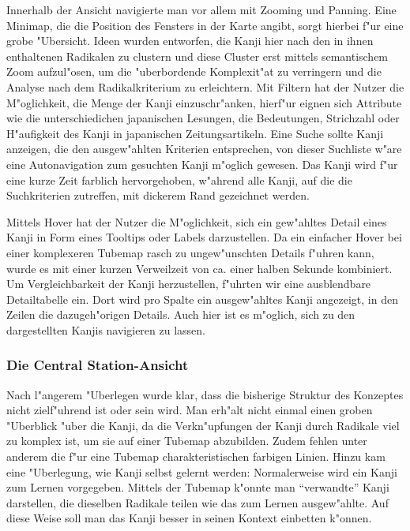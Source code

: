 Innerhalb der Ansicht navigierte man vor allem mit Zooming und Panning. Eine Minimap, die die Position des Fensters in der Karte angibt, sorgt hierbei f"ur eine grobe "Ubersicht. Ideen wurden entworfen, die Kanji hier nach den in ihnen enthaltenen Radikalen zu clustern und diese Cluster erst mittels semantischem Zoom aufzul"osen, um die "uberbordende Komplexit"at zu verringern und die Analyse nach dem Radikalkriterium zu erleichtern. Mit Filtern hat der Nutzer die M"oglichkeit, die Menge der Kanji einzuschr"anken, hierf"ur eignen sich Attribute wie die unterschiedichen japanischen Lesungen, die Bedeutungen, Strichzahl oder H"aufigkeit des Kanji in japanischen Zeitungsartikeln. Eine Suche sollte Kanji anzeigen, die den ausgew"ahlten Kriterien entsprechen, von dieser Suchliste w"are eine Autonavigation zum gesuchten Kanji m"oglich gewesen. Das Kanji wird f"ur eine kurze Zeit farblich hervorgehoben, w"ahrend alle Kanji, auf die die Suchkriterien zutreffen, mit dickerem Rand gezeichnet werden.

Mittels Hover hat der Nutzer die M"oglichkeit, sich ein gew"ahltes Detail eines Kanji in Form eines Tooltips oder Labels darzustellen. Da ein einfacher Hover bei einer komplexeren Tubemap rasch zu ungew"unschten Details f"uhren kann, wurde es mit einer kurzen Verweilzeit von ca. einer halben Sekunde kombiniert. Um Vergleichbarkeit der Kanji herzustellen, f"uhrten wir eine ausblendbare Detailtabelle ein. Dort wird pro Spalte ein ausgew"ahltes Kanji angezeigt, in den Zeilen die dazugeh"origen Details. Auch hier ist es m"oglich, sich zu den dargestellten Kanjis navigieren zu lassen.


\subsubsection{Die Central Station-Ansicht}
Nach l"angerem "Uberlegen wurde klar, dass die bisherige Struktur des Konzeptes nicht zielf"uhrend ist oder sein wird. Man erh"alt nicht einmal einen groben "Uberblick "uber die Kanji, da die Verkn"upfungen der Kanji durch Radikale viel zu komplex ist, um sie auf einer Tubemap abzubilden. Zudem fehlen unter anderem die f"ur eine Tubemap charakteristischen farbigen Linien. Hinzu kam eine "Uberlegung, wie Kanji selbst gelernt werden: Normalerweise wird ein Kanji zum Lernen vorgegeben. Mittels der Tubemap k"onnte man "`verwandte"' Kanji darstellen, die dieselben Radikale teilen wie das zum Lernen ausgew"ahlte. Auf diese Weise soll man das Kanji besser in seinen Kontext einbetten k"onnen.


